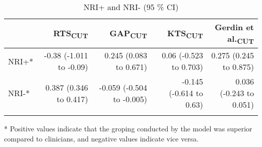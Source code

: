 \begin{table}[!ht]
\centering
\caption{NRI+ and NRI- (95 \% CI)} 
\label{table:reclassification}
\begin{adjustbox}{max width = \linewidth} 
\begin{threeparttable} 
\begin{tabular} 
{lrrrr}
   & RTS\textsubscript{CUT} & GAP\textsubscript{CUT} & KTS\textsubscript{CUT} & Gerdin et al.\textsubscript{CUT} \\ 
  \midrule
NRI+* & -0.38 (-1.011 to -0.09) & 0.245 (0.083 to 0.671) & 0.06 (-0.523 to 0.703) & 0.275 (0.245 to 0.875) \\ 
  NRI-* & 0.387 (0.346 to 0.417) & -0.059 (-0.504 to -0.005) & -0.145 (-0.614 to 0.63) & 0.036 (-0.243 to 0.051) \\ 
   \bottomrule
\addlinespace 
\end{tabular} 
\begin{tablenotes} \footnotesize 
\item[*] Positive values indicate that the groping conducted by the model was superior compared to clinicians, and negative values indicate vice versa. 

\end{tablenotes} 
\end{threeparttable} 
\end{adjustbox}
\end{table}

